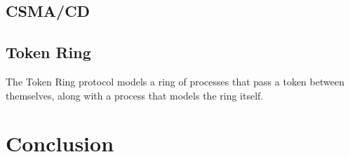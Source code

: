 \documentclass[a4paper,12pt]{article}
\begin{document}
\subsection{CSMA/CD}\label{evaluation-csma}
\subsection{Token Ring}\label{evaluation-token}

The Token Ring protocol models a ring of processes that pass a token between
themselves, along with a process that models the ring itself.

\section{Conclusion}\label{conclusion}
\end{document}
